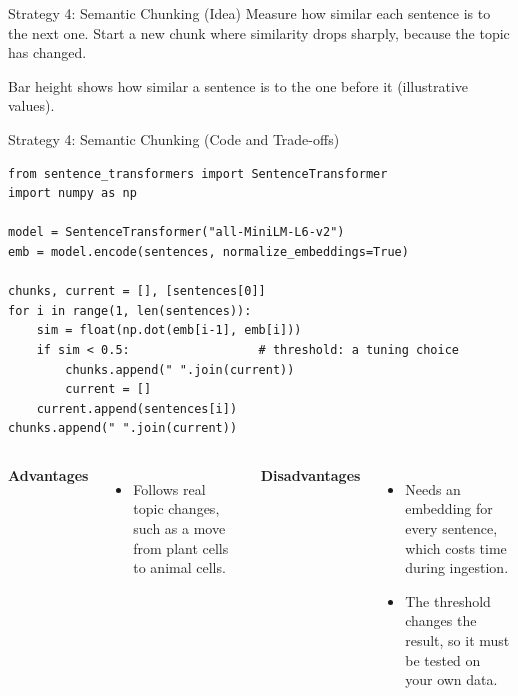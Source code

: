 \documentclass[aspectratio=169,10pt]{beamer}
\begin{document}
\begin{frame}[t]{Strategy 4: Semantic Chunking (Idea)}
\small
Measure how similar each sentence is to the next one. Start a new chunk where similarity drops sharply, because the topic has changed.
\vspace{14pt}
\begin{center}
\end{center}
\vspace{4pt}
\small
Bar height shows how similar a sentence is to the one before it (illustrative values).
\end{frame}

\begin{frame}[t,fragile]{Strategy 4: Semantic Chunking (Code and Trade-offs)}
\small
\lstset{basicstyle=\ttfamily\footnotesize}
\begin{lstlisting}
from sentence_transformers import SentenceTransformer
import numpy as np

model = SentenceTransformer("all-MiniLM-L6-v2")
emb = model.encode(sentences, normalize_embeddings=True)

chunks, current = [], [sentences[0]]
for i in range(1, len(sentences)):
    sim = float(np.dot(emb[i-1], emb[i]))
    if sim < 0.5:                  # threshold: a tuning choice
        chunks.append(" ".join(current))
        current = []
    current.append(sentences[i])
chunks.append(" ".join(current))
\end{lstlisting}
\vspace{4pt}
\begin{columns}[T]
\textbf{Advantages}
\begin{itemize}
  \item Follows real topic changes, such as a move from plant cells to animal cells.
\end{itemize}
\textbf{Disadvantages}
\begin{itemize}
  \item Needs an embedding for every sentence, which costs time during ingestion.
  \item The threshold changes the result, so it must be tested on your own data.
\end{itemize}
\end{columns}
\end{frame}
\end{document}
